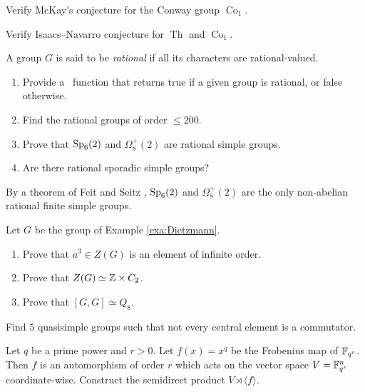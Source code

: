 \begin{prob}
	\label{prob:McKay:M11}
	Verify McKay's conjecture for the 
	Conway group $\operatorname{Co}_{1}$.
\end{prob}

\begin{prob}
    Verify Isaacs--Navarro conjecture for $\operatorname{Th}$ 
    and $\operatorname{Co}_1$. 
\end{prob}

\begin{prob}
    A group $G$ is said to be \emph{rational} if all its characters are rational-valued.
    \begin{enumerate}
        \item Provide a \GAP~function that returns true if a given group is rational, or false otherwise.
        \item Find the rational groups of order $\leq 200$.
        \item Prove that $\operatorname{Sp}_6(2)$ and $\Omega^+_8(2)$ are rational simple groups.
        \item Are there rational sporadic simple groups? 
    \end{enumerate}
    By a theorem of Feit and Seitz  
    \cite{MR974014}, $\operatorname{Sp}_6(2)$ and $\Omega^+_8(2)$
    are the only non-abelian rational finite simple groups. 
\end{prob}

\begin{prob}
    Let $G$ be the group of Example \ref{exa:Dietzmann}. 
    \begin{enumerate}
        \item Prove that $a^3\in Z(G)$ is an element of infinite order.
        \item Prove that $Z(G)\simeq\mathbb{Z}\times C_2$. 
        \item Prove that $[G,G]\simeq Q_8$. 
    \end{enumerate}
\end{prob}

\begin{prob}
    Find $5$ quasisimple groups such that not every central element is a commutator.
\end{prob}

\begin{prob}
    Let $q$ be a prime power and $r > 0$.
    Let $f(x) = x^q$ be the Frobenius map of $\mathbb{F}_{q^r}$.
    Then $f$ is an automorphism of order $r$ which acts on the vector space $V = \mathbb{F}_{q^r}^n$ coordinate-wise.
    Construct the semidirect product $V\rtimes \langle f\rangle$.
\end{prob}